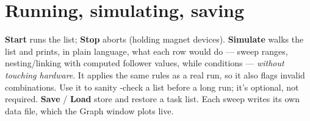 \documentclass[11pt,a4paper]{article}
\begin{document}
\section{Running, simulating, saving}

\textbf{Start} runs the list; \textbf{Stop} aborts (holding magnet devices).
\textbf{Simulate} walks the list and prints, in plain language, what each row
would do --- sweep ranges, nesting/linking with computed follower values,
while conditions --- \emph{without touching hardware}. It applies the same
rules as a real run, so it also flags invalid combinations. Use it to sanity
-check a list before a long run; it's optional, not required. \textbf{Save} /
\textbf{Load} store and restore a task list. Each sweep writes its own data
file, which the Graph window plots live.
\end{document}
